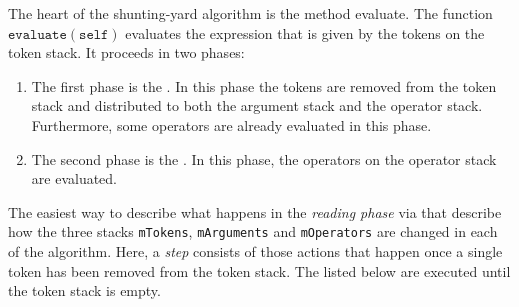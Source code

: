 The heart of the shunting-yard algorithm is the method evaluate.
The function $\texttt{evaluate}(\texttt{self})$ evaluates the expression that is given by the tokens on the
token stack.  It proceeds in two phases:
\begin{enumerate}
\item The first phase is the . In this phase
      the tokens are removed from the token stack and distributed to both the argument stack and the operator
      stack.  Furthermore, some operators are already evaluated in this phase.
\item The second phase is the .  In this phase,
      the  operators on the operator stack are evaluated.  
\end{enumerate}
The easiest way to describe what happens in the \emph{reading phase} via
 that describe how the three stacks \texttt{mTokens}, \texttt{mArguments} and \texttt{mOperators}
are changed in each  of the algorithm.  Here, a \emph{step} consists of those actions that happen
once a single token has been removed from the token stack.
The  listed below are executed until the token stack is empty.
